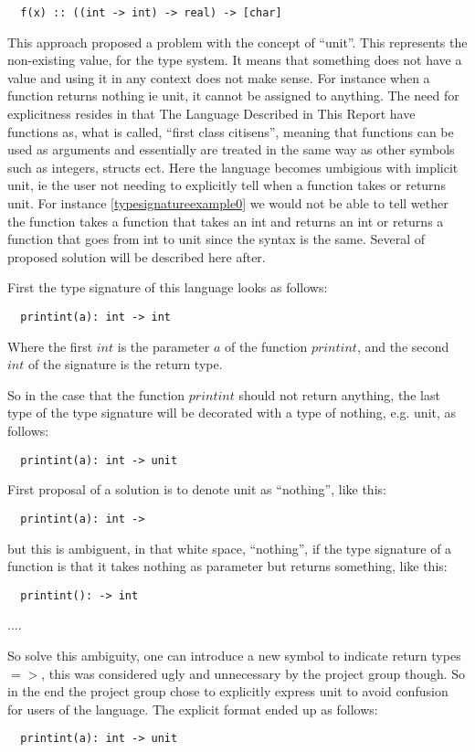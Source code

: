 \begin{verbatim}
  f(x) :: ((int -> int) -> real) -> [char]
\end{verbatim}
\label{typesignatureexample1}

This approach proposed a problem with the concept of \enquote{unit}. This represents the non-existing value, for the type system. It means that something does not have a value and using it in any context does not make sense. For instance when a function returns nothing ie unit, it cannot be assigned to anything. The need for explicitness resides in that The Language Described in This Report have functions as, what is called, \enquote{first class citisens}, meaning that functions can be used as arguments and essentially are treated in the same way as other symbols such as integers, structs ect. Here the language becomes umbigious with implicit unit, ie the user not needing to explicitly tell when a function takes or returns unit. For instance \cref{typesignatureexample0} we would not be able to tell wether the function takes a function that takes an int and returns an int or returns a function that goes from int to unit since the syntax is the same.
Several of proposed solution will be described here after.

First the type signature of this language looks as follows:
\begin{verbatim}
  printint(a): int -> int
\end{verbatim}
Where the first $int$ is the parameter $a$ of the function $printint$, and the second $int$ of the signature is the return type.

So in the case that the function $printint$ should not return anything, the last type of the type signature will be decorated with a type of nothing, e.g. unit, as follows:
\begin{verbatim}
  printint(a): int -> unit
\end{verbatim}

First proposal of a solution is to denote unit as \enquote{nothing}, like this:
\begin{verbatim}
  printint(a): int ->
\end{verbatim}
but this is ambiguent, in that white space, \enquote{nothing}, if the type signature of a function is that it takes nothing as parameter but returns something, like this:
\begin{verbatim}
  printint(): -> int
\end{verbatim}
.... %


So solve this ambiguity, one can introduce a new symbol to indicate return types $=>$, this was considered ugly and unnecessary by the project group though. So in the end the project group chose to explicitly express unit to avoid confusion for users of the language. The explicit format ended up as follows:
\begin{verbatim}
  printint(a): int -> unit
\end{verbatim}

